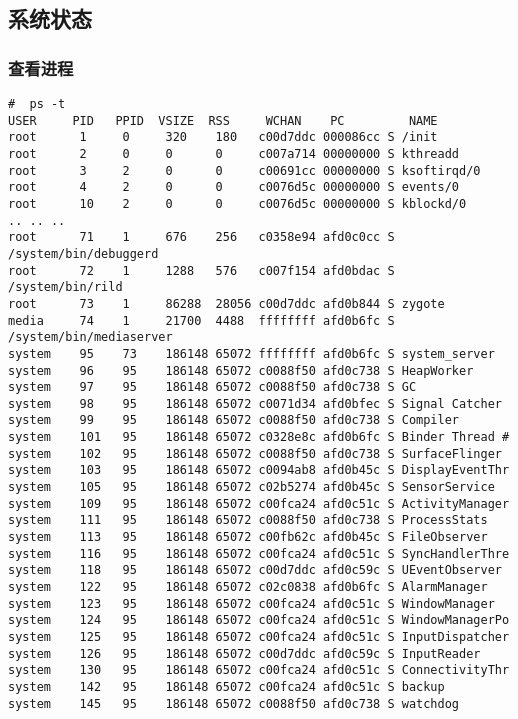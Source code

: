 \documentclass[a4paper,titlepage]{article}
\begin{document}
\subsection{系统状态}
\subsubsection{查看进程}
\begin{lstlisting}[basicstyle=\tiny]
 #  ps -t
USER     PID   PPID  VSIZE  RSS     WCHAN    PC         NAME
root      1     0     320    180   c00d7ddc 000086cc S /init
root      2     0     0      0     c007a714 00000000 S kthreadd
root      3     2     0      0     c00691cc 00000000 S ksoftirqd/0
root      4     2     0      0     c0076d5c 00000000 S events/0
root      10    2     0      0     c0076d5c 00000000 S kblockd/0
.. .. .. 
root      71    1     676    256   c0358e94 afd0c0cc S /system/bin/debuggerd
root      72    1     1288   576   c007f154 afd0bdac S /system/bin/rild
root      73    1     86288  28056 c00d7ddc afd0b844 S zygote
media     74    1     21700  4488  ffffffff afd0b6fc S /system/bin/mediaserver
system    95    73    186148 65072 ffffffff afd0b6fc S system_server
system    96    95    186148 65072 c0088f50 afd0c738 S HeapWorker
system    97    95    186148 65072 c0088f50 afd0c738 S GC
system    98    95    186148 65072 c0071d34 afd0bfec S Signal Catcher
system    99    95    186148 65072 c0088f50 afd0c738 S Compiler
system    101   95    186148 65072 c0328e8c afd0b6fc S Binder Thread #
system    102   95    186148 65072 c0088f50 afd0c738 S SurfaceFlinger
system    103   95    186148 65072 c0094ab8 afd0b45c S DisplayEventThr
system    105   95    186148 65072 c02b5274 afd0b45c S SensorService
system    109   95    186148 65072 c00fca24 afd0c51c S ActivityManager
system    111   95    186148 65072 c0088f50 afd0c738 S ProcessStats
system    113   95    186148 65072 c00fb62c afd0b45c S FileObserver
system    116   95    186148 65072 c00fca24 afd0c51c S SyncHandlerThre
system    118   95    186148 65072 c00d7ddc afd0c59c S UEventObserver
system    122   95    186148 65072 c02c0838 afd0b6fc S AlarmManager
system    123   95    186148 65072 c00fca24 afd0c51c S WindowManager
system    124   95    186148 65072 c00fca24 afd0c51c S WindowManagerPo
system    125   95    186148 65072 c00fca24 afd0c51c S InputDispatcher
system    126   95    186148 65072 c00d7ddc afd0c59c S InputReader
system    130   95    186148 65072 c00fca24 afd0c51c S ConnectivityThr
system    142   95    186148 65072 c00fca24 afd0c51c S backup
system    145   95    186148 65072 c0088f50 afd0c738 S watchdog

\end{lstlisting}
\end{document}
